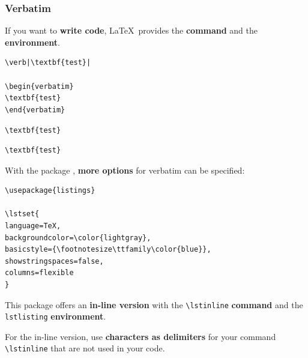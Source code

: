 \begin{frame}[fragile]
\frametitle{Verbatim}

If you want to \textbf{write code}, \LaTeX\ provides the \textbf{ command} and the \textbf{ environment}.

\begin{multicols}{2}
	
\begin{lstlisting}
\verb|\textbf{test}|

\begin{verbatim}
\textbf{test}
\end{verbatim}

\end{lstlisting}	

\columnbreak

\verb|\textbf{test}|

\begin{verbatim}
\textbf{test}
\end{verbatim}

\end{multicols}

\end{frame}


\begin{frame}[fragile]

With the package , \textbf{more options} for verbatim can be specified:

\begin{lstlisting}
\usepackage{listings}

\lstset{
language=TeX,
backgroundcolor=\color{lightgray},
basicstyle={\footnotesize\ttfamily\color{blue}},
showstringspaces=false,
columns=flexible
}
\end{lstlisting}

\bigskip

This package offers an \textbf{in-line version} with the \lstinline|\lstinline| \textbf{command} 
and the \lstinline|lstlisting| \textbf{environment}.

\bigskip

For the in-line version, use \textbf{characters as delimiters} for your command \lstinline|\lstinline| that are not used in your code.



\end{frame}

